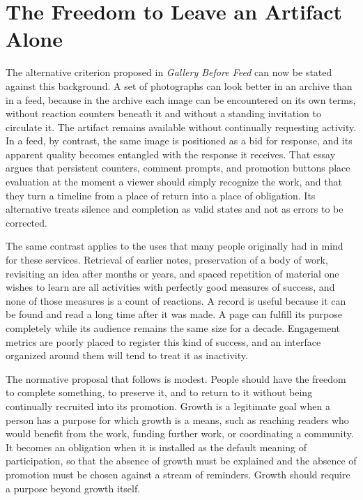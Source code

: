 \documentclass[12pt]{article}
\theoremstyle{plain}
\theoremstyle{definition}
\begin{document}
\section{The Freedom to Leave an Artifact Alone}

The alternative criterion proposed in \emph{Gallery Before Feed} \cite{flyxion2026gallery} can now be stated against this background. A set of photographs can look better in an archive than in a feed, because in the archive each image can be encountered on its own terms, without reaction counters beneath it and without a standing invitation to circulate it. The artifact remains available without continually requesting activity. In a feed, by contrast, the same image is positioned as a bid for response, and its apparent quality becomes entangled with the response it receives. That essay argues that persistent counters, comment prompts, and promotion buttons place evaluation at the moment a viewer should simply recognize the work, and that they turn a timeline from a place of return into a place of obligation. Its alternative treats silence and completion as valid states and not as errors to be corrected.

The same contrast applies to the uses that many people originally had in mind for these services. Retrieval of earlier notes, preservation of a body of work, revisiting an idea after months or years, and spaced repetition of material one wishes to learn are all activities with perfectly good measures of success, and none of those measures is a count of reactions. A record is useful because it can be found and read a long time after it was made. A page can fulfill its purpose completely while its audience remains the same size for a decade. Engagement metrics are poorly placed to register this kind of success, and an interface organized around them will tend to treat it as inactivity.

The normative proposal that follows is modest. People should have the freedom to complete something, to preserve it, and to return to it without being continually recruited into its promotion. Growth is a legitimate goal when a person has a purpose for which growth is a means, such as reaching readers who would benefit from the work, funding further work, or coordinating a community. It becomes an obligation when it is installed as the default meaning of participation, so that the absence of growth must be explained and the absence of promotion must be chosen against a stream of reminders. Growth should require a purpose beyond growth itself.
\end{document}
